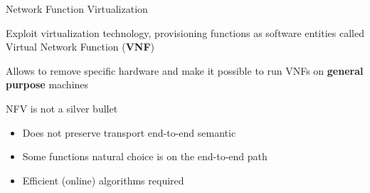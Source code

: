 \begin{frame}{Network Function Virtualization}

  Exploit virtualization technology, provisioning functions as software
  entities called Virtual Network Function (\textbf{VNF})

  \vfill{}

  Allows to remove specific hardware and make it possible to run VNFs on
  \textbf{general purpose} machines

  \vfill{}

  NFV is not a silver bullet
  \begin{itemize}
    \item Does not preserve transport end-to-end semantic
    \item Some functions natural choice is on the end-to-end path
    \item Efficient (online) algorithms required
  \end{itemize}

  \vfill{}

\end{frame}